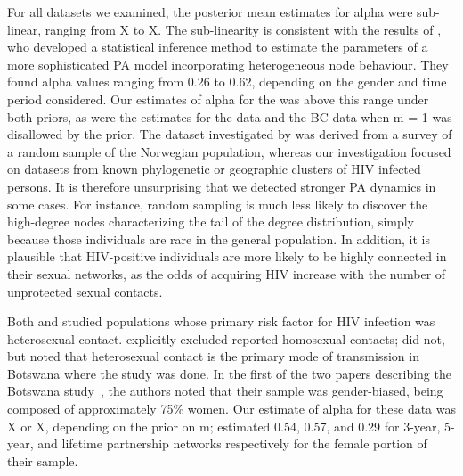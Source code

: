 For all datasets we examined, the posterior mean estimates for \gls{alpha} were
sub-linear, ranging from X to X. The sub-linearity is consistent with the
results of \textcite{de2007preferential}, who developed a statistical inference
method to estimate the parameters of a more sophisticated \acrlong{PA} model
incorporating heterogeneous node behaviour. They found \gls{alpha} values
ranging from 0.26 to 0.62, depending on the gender and time period considered. 
Our estimates of \gls{alpha} for the \textcite{niculescu2015recent} was above
this range under both priors, as were the estimates for the
\textcite{wang2015targeting} data and the BC data when \gls{m} = 1 was
disallowed by the prior. The dataset investigated by
\textcite{de2007preferential} was derived from a survey of a random sample of
the Norwegian population, whereas our investigation focused on datasets from
known phylogenetic or geographic clusters of \gls{HIV} infected persons. It is
therefore unsurprising that we detected stronger \acrlong{PA} dynamics in some
cases. For instance, random sampling is much less likely to discover the
high-degree nodes characterizing the tail of the degree distribution, simply
because those individuals are rare in the general population. In addition, it
is plausible that \gls{HIV}-positive individuals are more likely to be highly
connected in their sexual networks, as the odds of acquiring \gls{HIV} increase
with the number of unprotected sexual contacts.

Both \textcite{de2007preferential} and \textcite{novitsky2014impact} studied
populations whose primary risk factor for \gls{HIV} infection was heterosexual
contact. \citeauthor{de2007preferential} explicitly excluded reported
homosexual contacts; \citeauthor{novitsky2014impact} did not, but noted that
heterosexual contact is the primary mode of transmission in Botswana where the
study was done. In the first of the two papers describing the Botswana
study~\autocite{novitsky2013phylogenetic}, the authors noted that their sample
was gender-biased, being composed of approximately 75\% women. Our estimate of
\gls{alpha} for these data was X or X, depending on the prior on \gls{m};
\citeauthor{de2007preferential} estimated 0.54, 0.57, and 0.29 for 3-year,
5-year, and lifetime partnership networks respectively for the female portion
of their sample.

